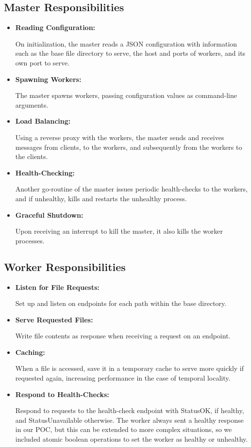 \documentclass[10pt]{article}
\begin{document}
\begin{multicols}{2}
\subsection*{Master Responsibilities}
\begin{itemize}
\item 
\textbf{Reading Configuration:}
\par
On initialization, the master reads a JSON configuration with information such as the base file directory to serve, the host and ports of workers, and its own port to serve.
\item
\textbf{Spawning Workers:}
\par
The master spawns workers, passing configuration values as command-line arguments.
\item
\textbf{Load Balancing:}
\par
Using a reverse proxy with the workers, the master sends and receives messages from clients, to the workers, and subsequently from the workers to the clients.
\item
\textbf{Health-Checking:}
\par
Another go-routine of the master issues periodic health-checks to the workers, and if unhealthy, kills and restarts the unhealthy process.
\item
\textbf{Graceful Shutdown:}
\par
Upon receiving an interrupt to kill the master, it also kills the worker processes.
\end{itemize}
\subsection*{Worker Responsibilities}
\begin{itemize}
\item
\textbf{Listen for File Requests:}
\par
Set up and listen on endpoints for each path within the base directory.
\item
\textbf{Serve Requested Files:}
\par
Write file contents as response when receiving a request on an endpoint.
\item
\textbf{Caching:}
\par
When a file is accessed, save it in a temporary cache to serve more quickly if requested again, increasing performance in the case of temporal locality.
\item
\textbf{Respond to Health-Checks:}
\par
Respond to requests to the health-check endpoint with StatusOK, if healthy, and StatusUnavailable otherwise. The worker always sent a healthy response in our POC, but this can be extended to more complex situations, so we included atomic boolean operations to set the worker as healthy or unhealthy.
\end{itemize}
\end{multicols}
\end{document}
